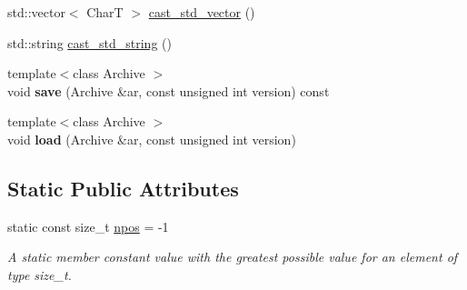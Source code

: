 \begin{CompactItemize}
\item 
std::vector$<$ CharT $>$ \hyperlink{classvector__string_752e8dc22949fe14102e7164f5a970c3}{cast\_\-std\_\-vector} ()
\item 
std::string \hyperlink{classvector__string_5648f7c6fcf1d8b3c89accab7362ba00}{cast\_\-std\_\-string} ()
\item 
\hypertarget{classvector__string_9282d56289047019724a8821a9cb708b}{
{\footnotesize template$<$class Archive $>$ }\\void \textbf{save} (Archive \&ar, const unsigned int version) const }
\label{classvector__string_9282d56289047019724a8821a9cb708b}

\item 
\hypertarget{classvector__string_27ee2fded42715e48ae0e7755d39b832}{
{\footnotesize template$<$class Archive $>$ }\\void \textbf{load} (Archive \&ar, const unsigned int version)}
\label{classvector__string_27ee2fded42715e48ae0e7755d39b832}

\end{CompactItemize}
\subsection*{Static Public Attributes}
\begin{CompactItemize}
\item 
\hypertarget{classvector__string_073b48043937e79ead0703a49426be1a}{
static const size\_\-t \hyperlink{classvector__string_073b48043937e79ead0703a49426be1a}{npos} = -1}
\label{classvector__string_073b48043937e79ead0703a49426be1a}

\begin{CompactList}\small\item\em A static member constant value with the greatest possible value for an element of type size\_\-t. \item\end{CompactList}\end{CompactItemize}
